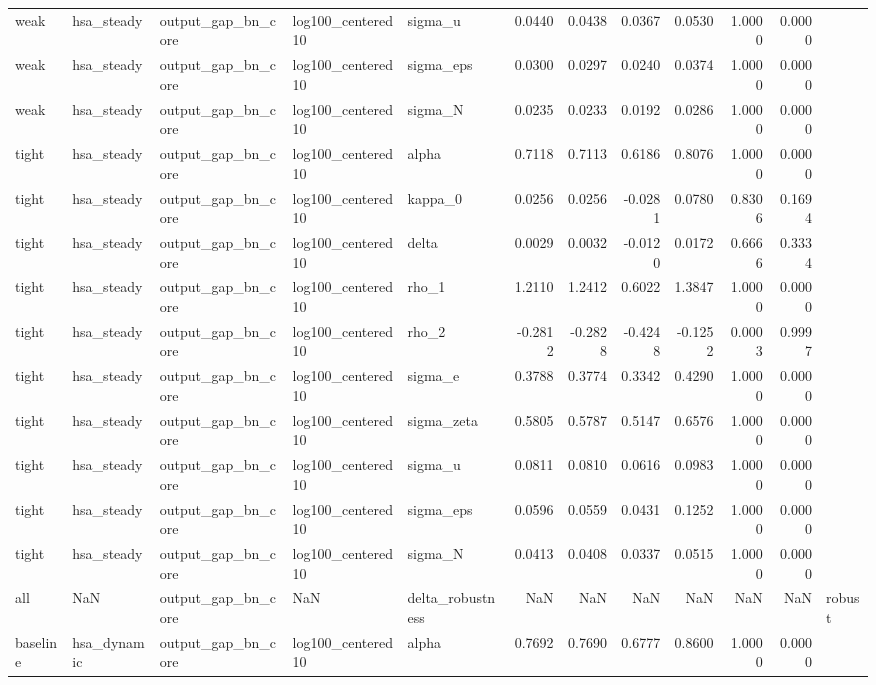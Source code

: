 \begin{tabular}{lllllrrrrrrl}
weak & hsa\_steady & output\_gap\_bn\_core & log100\_centered10 & sigma\_u & 0.0440 & 0.0438 & 0.0367 & 0.0530 & 1.0000 & 0.0000 &  \\
weak & hsa\_steady & output\_gap\_bn\_core & log100\_centered10 & sigma\_eps & 0.0300 & 0.0297 & 0.0240 & 0.0374 & 1.0000 & 0.0000 &  \\
weak & hsa\_steady & output\_gap\_bn\_core & log100\_centered10 & sigma\_N & 0.0235 & 0.0233 & 0.0192 & 0.0286 & 1.0000 & 0.0000 &  \\
tight & hsa\_steady & output\_gap\_bn\_core & log100\_centered10 & alpha & 0.7118 & 0.7113 & 0.6186 & 0.8076 & 1.0000 & 0.0000 &  \\
tight & hsa\_steady & output\_gap\_bn\_core & log100\_centered10 & kappa\_0 & 0.0256 & 0.0256 & -0.0281 & 0.0780 & 0.8306 & 0.1694 &  \\
tight & hsa\_steady & output\_gap\_bn\_core & log100\_centered10 & delta & 0.0029 & 0.0032 & -0.0120 & 0.0172 & 0.6666 & 0.3334 &  \\
tight & hsa\_steady & output\_gap\_bn\_core & log100\_centered10 & rho\_1 & 1.2110 & 1.2412 & 0.6022 & 1.3847 & 1.0000 & 0.0000 &  \\
tight & hsa\_steady & output\_gap\_bn\_core & log100\_centered10 & rho\_2 & -0.2812 & -0.2828 & -0.4248 & -0.1252 & 0.0003 & 0.9997 &  \\
tight & hsa\_steady & output\_gap\_bn\_core & log100\_centered10 & sigma\_e & 0.3788 & 0.3774 & 0.3342 & 0.4290 & 1.0000 & 0.0000 &  \\
tight & hsa\_steady & output\_gap\_bn\_core & log100\_centered10 & sigma\_zeta & 0.5805 & 0.5787 & 0.5147 & 0.6576 & 1.0000 & 0.0000 &  \\
tight & hsa\_steady & output\_gap\_bn\_core & log100\_centered10 & sigma\_u & 0.0811 & 0.0810 & 0.0616 & 0.0983 & 1.0000 & 0.0000 &  \\
tight & hsa\_steady & output\_gap\_bn\_core & log100\_centered10 & sigma\_eps & 0.0596 & 0.0559 & 0.0431 & 0.1252 & 1.0000 & 0.0000 &  \\
tight & hsa\_steady & output\_gap\_bn\_core & log100\_centered10 & sigma\_N & 0.0413 & 0.0408 & 0.0337 & 0.0515 & 1.0000 & 0.0000 &  \\
all & NaN & output\_gap\_bn\_core & NaN & delta\_robustness & NaN & NaN & NaN & NaN & NaN & NaN & robust \\
baseline & hsa\_dynamic & output\_gap\_bn\_core & log100\_centered10 & alpha & 0.7692 & 0.7690 & 0.6777 & 0.8600 & 1.0000 & 0.0000 &  \\

\end{tabular}
